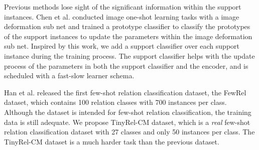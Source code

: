 Previous methods lose sight of the significant information within the support instances.
Chen et al.  conducted image one-shot learning tasks with a image deformation sub net and trained a prototype classifier to classify the prototypes of the support instances to update the parameters within the image deformation sub net. Inspired by this work, we add a support classifier over each support instance during the training process. The support classifier helps with the update process of the parameters in both the support classifier and the encoder, and is scheduled with a fast-slow learner schema.


Han et al.  released the first few-shot relation classification dataset, the FewRel dataset, which contains 100 relation classes with 700 instances per class. Although the dataset is intended for few-shot relation classification, the training data is still adequate.
We propose TinyRel-CM dataset, which is a \emph{real} few-shot relation classification dataset with 27 classes and only 50 instances per class. The TinyRel-CM dataset is a much harder task than the previous dataset.
